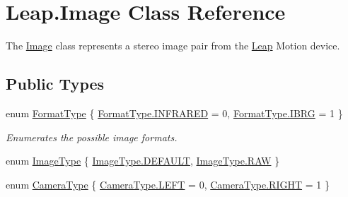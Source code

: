 \hypertarget{class_leap_1_1_image}{}\section{Leap.\+Image Class Reference}
\label{class_leap_1_1_image}


The \mbox{\hyperlink{class_leap_1_1_image}{Image}} class represents a stereo image pair from the \mbox{\hyperlink{namespace_leap}{Leap}} Motion device.  


\subsection*{Public Types}
\begin{DoxyCompactItemize}
\item 
enum \mbox{\hyperlink{class_leap_1_1_image_acefbe5d3803afc9f433a6e3856d242d1}{Format\+Type}} \{ \mbox{\hyperlink{class_leap_1_1_image_acefbe5d3803afc9f433a6e3856d242d1aff92c9d80b80d38c9022de2405a9e80d}{Format\+Type.\+I\+N\+F\+R\+A\+R\+ED}} = 0, 
\mbox{\hyperlink{class_leap_1_1_image_acefbe5d3803afc9f433a6e3856d242d1a4c7dacc91ca63ccea661d62e6a4faad1}{Format\+Type.\+I\+B\+RG}} = 1
 \}
\begin{DoxyCompactList}\small\item\em Enumerates the possible image formats. \end{DoxyCompactList}\item 
enum \mbox{\hyperlink{class_leap_1_1_image_a876a507d46b2dfce38d703a05cc4377f}{Image\+Type}} \{ \mbox{\hyperlink{class_leap_1_1_image_a876a507d46b2dfce38d703a05cc4377fa5b39c8b553c821e7cddc6da64b5bd2ee}{Image\+Type.\+D\+E\+F\+A\+U\+LT}}, 
\mbox{\hyperlink{class_leap_1_1_image_a876a507d46b2dfce38d703a05cc4377fa633d6abff0a3fc22404347728d195059}{Image\+Type.\+R\+AW}}
 \}
\item 
enum \mbox{\hyperlink{class_leap_1_1_image_a28310e43e0f2d7f7117e1b45330bdc38}{Camera\+Type}} \{ \mbox{\hyperlink{class_leap_1_1_image_a28310e43e0f2d7f7117e1b45330bdc38a684d325a7303f52e64011467ff5c5758}{Camera\+Type.\+L\+E\+FT}} = 0, 
\mbox{\hyperlink{class_leap_1_1_image_a28310e43e0f2d7f7117e1b45330bdc38a21507b40c80068eda19865706fdc2403}{Camera\+Type.\+R\+I\+G\+HT}} = 1
 \}
\end{DoxyCompactItemize}
